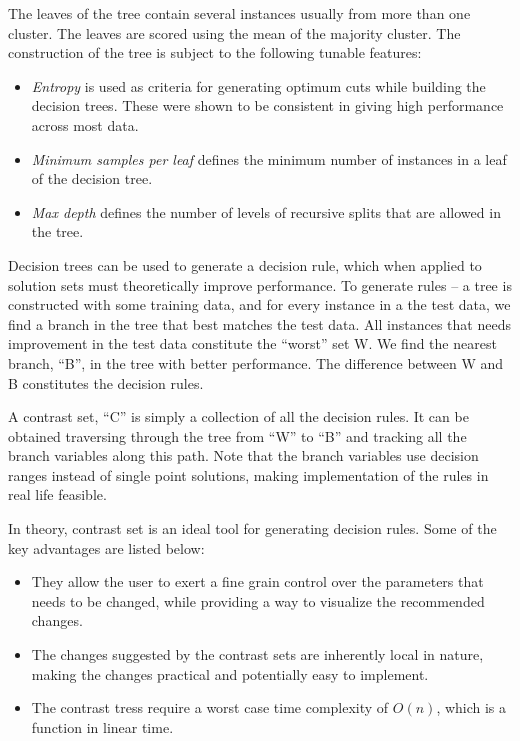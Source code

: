 \documentclass[conference]{IEEEtran}
\begin{document}
The leaves of the tree contain several instances usually from more than one cluster. The leaves are scored using the mean of the majority cluster. The construction of the tree is subject to the following tunable features:
\begin{itemize}
\item \textit{Entropy} is used as criteria for generating optimum cuts while building the decision trees. These were shown to be consistent in giving high performance across most data.
\item \textit{Minimum samples per leaf} defines the minimum number of instances in a leaf of the decision tree.
\item \textit{Max depth} defines the number of levels of recursive splits that are allowed in the tree.
\end{itemize}

Decision trees can be used to generate a decision rule, which when applied to solution sets must theoretically improve performance. To generate rules -- a tree is constructed with some training data, and for every instance in a the test data, we find a branch in the tree that best matches the test data. All instances that needs improvement in the test data constitute the ``worst'' set W. We find the nearest branch, ``B'', in the tree with better performance. The difference between W and B constitutes the decision rules.

A contrast set, ``C'' is simply a collection of all the decision rules. It can be obtained traversing through the tree from ``W'' to ``B'' and tracking all the branch variables along this path. Note that the branch variables use decision ranges instead of single point solutions, making implementation of the rules in real life feasible. 

In theory, contrast set is an ideal tool for generating decision rules. Some of the key advantages are listed below:
\begin{itemize}
\item They allow the user to exert a fine grain control over the parameters that needs to be changed, while providing a way to visualize the recommended changes.
\item The changes suggested by the contrast sets are inherently local in nature, making the changes practical and potentially easy to implement.
\item The contrast tress require a worst case time complexity of $O(n)$, which is a function in linear time.
\end{itemize}
\end{document}
